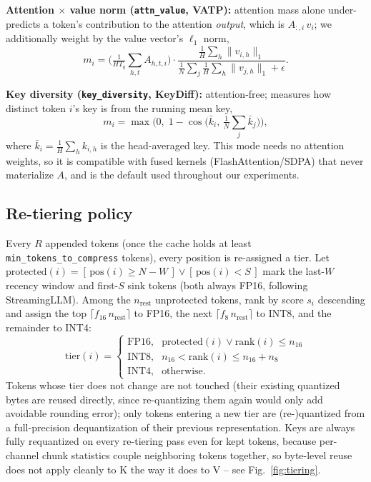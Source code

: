 \documentclass[conference]{IEEEtran}
\begin{document}
\textbf{Attention $\times$ value norm (\texttt{attn\_value}, VATP):} attention mass alone
under-predicts a token's contribution to the attention \emph{output}, which is
$A_{:,i}\,v_i$; we additionally weight by the value vector's $\ell_1$ norm,
\begin{equation}
  m_i = \Big(\tfrac{1}{HT_q}\sum_{h,t} A_{h,t,i}\Big)\cdot
        \frac{\frac1H\sum_h \lVert v_{i,h}\rVert_1}{\frac1N\sum_j \frac1H\sum_h \lVert v_{j,h}\rVert_1 + \epsilon}.
  \label{eq:vatp}
\end{equation}

\textbf{Key diversity (\texttt{key\_diversity}, KeyDiff):} attention-free; measures how
distinct token $i$'s key is from the running mean key,
\begin{equation}
  m_i = \max\!\Big(0,\; 1 - \cos\big(\bar{k}_i,\, \tfrac1N\textstyle\sum_j \bar{k}_j\big)\Big),
  \label{eq:keydiff}
\end{equation}
where $\bar{k}_i = \frac1H\sum_h k_{i,h}$ is the head-averaged key. This mode needs no
attention weights, so it is compatible with fused kernels (FlashAttention/SDPA) that
never materialize $A$, and is the default used throughout our experiments.

\subsection{Re-tiering policy}
\label{sec:retier}

Every $R$ appended tokens (once the cache holds at least \texttt{min\_tokens\_to\_compress}
tokens), every position is re-assigned a tier. Let
$\mathrm{protected}(i) = [\,\mathrm{pos}(i) \geq N - W\,] \lor [\,\mathrm{pos}(i) < S\,]$
mark the last-$W$ recency window and first-$S$ sink tokens (both always FP16, following
StreamingLLM). Among the $n_{\text{rest}}$ unprotected tokens, rank by score $s_i$
descending and assign the top $\lceil f_{16}\, n_{\text{rest}} \rceil$ to FP16, the next
$\lceil f_{8}\, n_{\text{rest}} \rceil$ to INT8, and the remainder to INT4:
\begin{equation}
  \mathrm{tier}(i) =
  \begin{cases}
    \text{FP16}, & \mathrm{protected}(i) \lor \mathrm{rank}(i) \le n_{16} \\
    \text{INT8}, & n_{16} < \mathrm{rank}(i) \le n_{16} + n_{8} \\
    \text{INT4}, & \text{otherwise.}
  \end{cases}
  \label{eq:tier}
\end{equation}
Tokens whose tier does not change are not touched (their existing quantized bytes are
reused directly, since re-quantizing them again would only add avoidable rounding
error); only tokens entering a new tier are (re-)quantized from a full-precision
dequantization of their previous representation. Keys are always fully requantized on
every re-tiering pass even for kept tokens, because per-channel chunk statistics couple
neighboring tokens together, so byte-level reuse does not apply cleanly to K the way it
does to V -- see Fig.~\ref{fig:tiering}.
\end{document}
